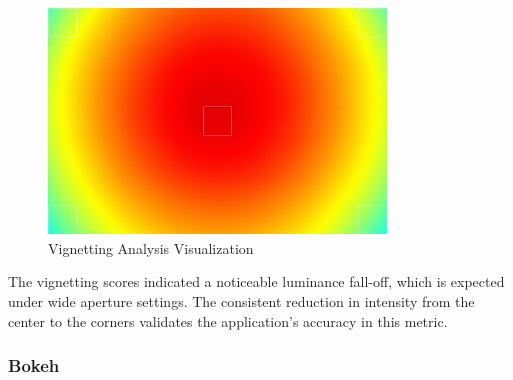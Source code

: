 \begin{figure}[H]
    \centering
    \includegraphics[width=0.8\textwidth]{Images/vignette_analysis_20241209_135329.jpg}
    \caption{Vignetting Analysis Visualization}
    \label{fig:vignetting_visualization}
\end{figure}

The vignetting scores indicated a noticeable luminance fall-off, which is expected under wide aperture settings. The consistent reduction in intensity from the center to the corners validates the application's accuracy in this metric.

\subsubsection{Bokeh}
\begin{table}[H]
    \centering
    \caption{Bokeh Assessment Scores}
    \label{tab:bokeh_scores}
\end{table}



